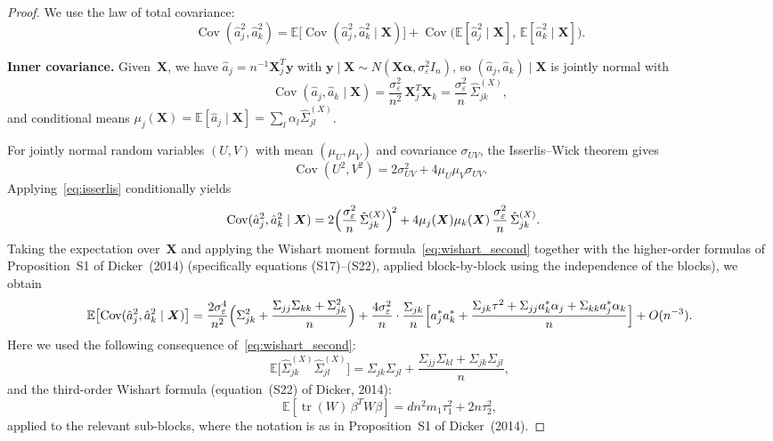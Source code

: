 \documentclass[11pt]{article}
\newcommand{\E}{\mathbb{E}}
\newcommand{\Cov}{\operatorname{Cov}}
\newcommand{\tr}{\operatorname{tr}}
\newcommand{\X}{\bm{X}}
\newcommand{\y}{\bm{y}}
\newcommand{\bal}{\bm{\alpha}}
\begin{document}
\begin{proof}
We use the law of total covariance:
\begin{equation}\label{eq:total_cov}
  \Cov(\hat{a}_j^{2},\hat{a}_k^{2})
  = \E\bigl[\Cov(\hat{a}_j^{2},\hat{a}_k^{2}\mid\X)\bigr]
    + \Cov\bigl(\E[\hat{a}_j^{2}\mid\X],\,\E[\hat{a}_k^{2}\mid\X]\bigr).
\end{equation}

\medskip
\noindent\textbf{Inner covariance.}\;
Given~$\X$, we have
$\hat{a}_j=n^{-1}\X_j^{T}\y$ with
$\y\mid\X\sim N(\X\bal,\sigma_\varepsilon^{2}I_n)$, so
$(\hat{a}_j,\hat{a}_k)\mid\X$ is jointly normal with
\begin{equation}\label{eq:cond_cov_jk}
  \Cov(\hat{a}_j,\hat{a}_k\mid\X)
  = \frac{\sigma_\varepsilon^{2}}{n^{2}}\,\X_j^{T}\X_k
  = \frac{\sigma_\varepsilon^{2}}{n}\,\hat\Sigma_{jk}^{(X)},
\end{equation}
and conditional means
$\mu_j(\X)=\E[\hat{a}_j\mid\X]=\sum_l\alpha_l\hat\Sigma_{jl}^{(X)}$.

For jointly normal random variables $(U,V)$ with mean $(\mu_U,\mu_V)$ and
covariance $\sigma_{UV}$, the Isserlis--Wick theorem gives
\begin{equation}\label{eq:isserlis}
  \Cov(U^{2},V^{2})
  = 2\sigma_{UV}^{2} + 4\mu_U\mu_V\sigma_{UV}.
\end{equation}
Applying~\eqref{eq:isserlis} conditionally yields
\begin{align}
  \Cov(\hat{a}_j^{2},\hat{a}_k^{2}\mid\X)
  &= 2\Bigl(\frac{\sigma_\varepsilon^{2}}{n}\,\hat\Sigma_{jk}^{(X)}\Bigr)^{\!2}
     + 4\mu_j(\X)\mu_k(\X)\,\frac{\sigma_\varepsilon^{2}}{n}\,\hat\Sigma_{jk}^{(X)}.
  \label{eq:cond_cov_sq}
\end{align}
Taking the expectation over~$\X$ and applying the Wishart moment formula~\eqref{eq:wishart_second} together with the higher-order formulas of
Proposition~S1 of Dicker~(2014) (specifically equations (S17)--(S22), applied
block-by-block using the independence of the blocks), we obtain
\begin{equation}\label{eq:inner_cov}
  \E\bigl[\Cov(\hat{a}_j^{2},\hat{a}_k^{2}\mid\X)\bigr]
  = \frac{2\sigma_\varepsilon^{4}}{n^{2}}
    \Bigl(\Sigma_{jk}^{2}+\frac{\Sigma_{jj}\Sigma_{kk}+\Sigma_{jk}^{2}}{n}\Bigr)
    + \frac{4\sigma_\varepsilon^{2}}{n}\cdot\frac{\Sigma_{jk}}{n}
      \Bigl[a_j^{*}a_k^{*}+\frac{\Sigma_{jk}\tau^{2}+\Sigma_{jj}a_k^{*}\alpha_j
        +\Sigma_{kk}a_j^{*}\alpha_k}{n}\Bigr]
    + O(n^{-3}).
\end{equation}
Here we used the following consequence of~\eqref{eq:wishart_second}:
\[
  \E\bigl[\hat\Sigma_{jk}^{(X)}\hat\Sigma_{jl}^{(X)}\bigr]
  = \Sigma_{jk}\Sigma_{jl}+\frac{\Sigma_{jj}\Sigma_{kl}+\Sigma_{jk}\Sigma_{jl}}{n},
\]
and the third-order Wishart formula (equation~(S22) of Dicker, 2014):
\[
  \E[\tr(W)\,\beta^{T}W\beta]
  = dn^{2}m_1\tau_1^{2}+2n\tau_2^{2},
\]
applied to the relevant sub-blocks, where the notation is as in Proposition~S1
of Dicker~(2014).


\end{proof}
\end{document}
